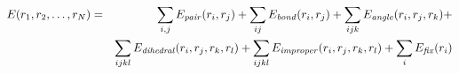 \documentclass[12pt]{article}
\begin{document}
\begin{eqnarray*}
E(r_1,r_2, \ldots ,r_N) & = & \sum_{i,j} E_{\it pair}(r_i,r_j) + 
                              \sum_{ij} E_{\it bond}(r_i,r_j) +
                              \sum_{ijk} E_{\it angle}(r_i,r_j,r_k) + \\
                           && \sum_{ijkl} E_{\it dihedral}(r_i,r_j,r_k,r_l) +
                              \sum_{ijkl} E_{\it improper}(r_i,r_j,r_k,r_l) +
                              \sum_i E_{\it fix}(r_i) 
\end{eqnarray*}
\end{document}
